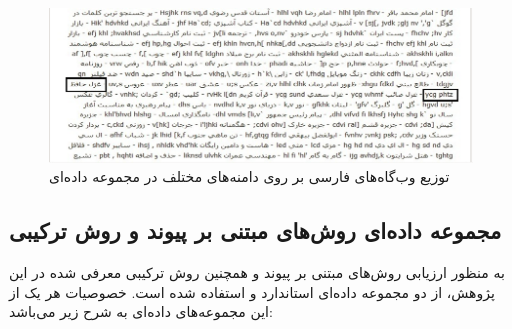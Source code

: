\documentclass[twoside, a4paper,11pt]{book}
\numberwithin{equation}{chapter}
\numberwithin{table}{chapter}
\numberwithin{figure}{chapter}
\numberwithin{equation}{chapter}
\begin{document}
\begin{figure}
\centering
\includegraphics[scale=0.8]{Figures/persianwebdist.png}
\caption{\label{fig:plotdsc}
توزیع وب‌گاه‌های فارسی بر روی دامنه‌های مختلف در مجموعه داده‌ای 
}
\end{figure}
\subsection{مجموعه ‌داده‌ای روش‌های مبتنی بر پیوند و روش ترکیبی}
به منظور ارزیابی روش‌های مبتنی بر پیوند و همچنین روش ترکیبی معرفی شده در این پژوهش، از دو مجموعه داده‌ای استاندارد  \cite{spam6} و  \cite{Yahooresearch} استفاده شده است. خصوصیات هر یک از این مجموعه‌های داده‌ای به شرح زیر می‌باشد:
\end{document}
